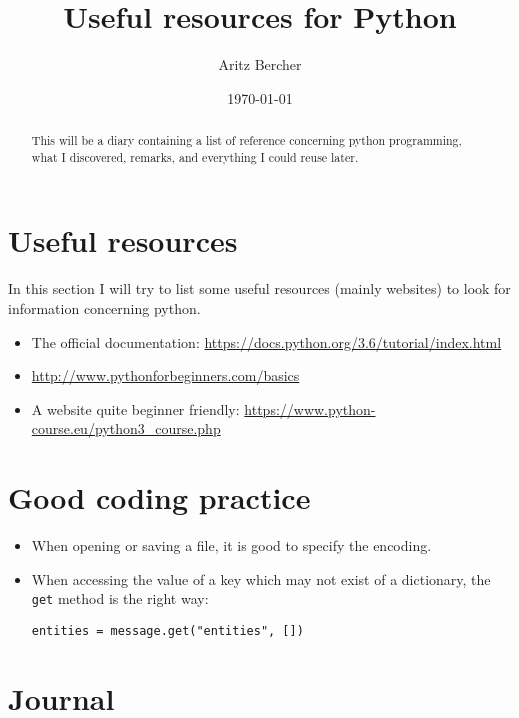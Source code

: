 \documentclass[11pt,a4paper]{article}
\title{Useful resources for Python}
\author{Aritz Bercher}
\date{\today}
\begin{document}
\maketitle

\begin{abstract}
This will be a diary containing a list of reference concerning python programming, what I discovered, remarks, and everything I could reuse later.
\end{abstract}

\tableofcontents

\section{Useful resources}
In this section I will try to list some useful resources (mainly websites) to look for information concerning python.
\begin{itemize}
\item The official documentation: \url{https://docs.python.org/3.6/tutorial/index.html}
\item \url{http://www.pythonforbeginners.com/basics}
\item A website quite beginner friendly: \url{https://www.python-course.eu/python3_course.php}
\end{itemize}

\section{Good coding practice}
\begin{itemize}
\item When opening or saving a file, it is good to specify the encoding.
\item When accessing the value of a key which may not exist of a dictionary, the \texttt{get} method is the right way:
\begin{verbatim}
entities = message.get("entities", [])
\end{verbatim}
\end{itemize}

\section{Journal}
\end{document}
